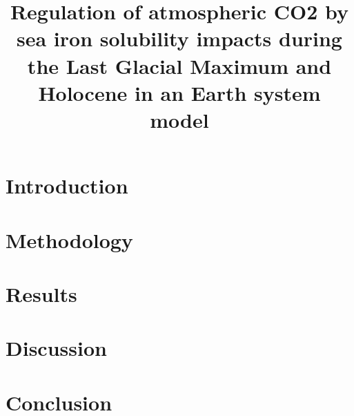 \documentclass{article} %
\title{{\color{astral} Regulation of atmospheric CO2 by sea iron solubility impacts during the Last Glacial Maximum and Holocene in an Earth system model}}
\date{}
\begin{document}
 
\maketitle

% 

\section{Introduction}




% 

\section{Methodology}



\section{Results}



\section{Discussion}



\section{Conclusion}






\end{document}

